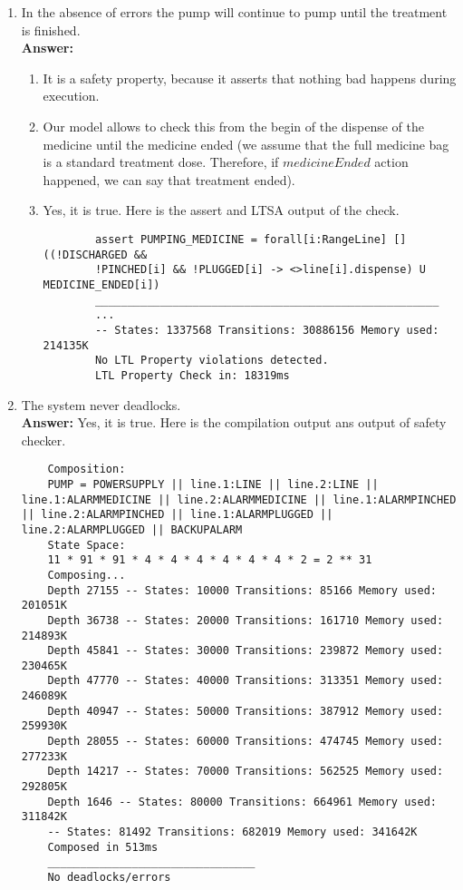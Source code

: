\documentclass{article}
\begin{document}
\begin{enumerate}
    \item In the absence of errors the pump will continue to pump until the treatment is finished.\\
    \textbf{Answer:} 
    \begin{enumerate}
    	\item It is a safety property, because it asserts that nothing bad happens during execution.
    	\item Our model allows to check this from the begin of the dispense of the medicine until the medicine ended 
    	(we assume that the full medicine bag is a standard treatment dose. Therefore, if $medicineEnded$ action happened, we
    	can say that treatment ended).
    	\item Yes, it is true. Here is the assert and LTSA output of the check.
    	\begin{verbatim}
    	assert PUMPING_MEDICINE = forall[i:RangeLine] []((!DISCHARGED && 
    	!PINCHED[i] && !PLUGGED[i] -> <>line[i].dispense) U MEDICINE_ENDED[i])
    	_____________________________________________________
	    ...
    	-- States: 1337568 Transitions: 30886156 Memory used: 214135K
    	No LTL Property violations detected.
    	LTL Property Check in: 18319ms
\end{verbatim}
	\end{enumerate}
    \item The system never deadlocks.\\
    \textbf{Answer:} 
    Yes, it is true. Here is the compilation output ans output of safety checker.
    \begin{verbatim}
    Composition:
    PUMP = POWERSUPPLY || line.1:LINE || line.2:LINE || line.1:ALARMMEDICINE || line.2:ALARMMEDICINE || line.1:ALARMPINCHED || line.2:ALARMPINCHED || line.1:ALARMPLUGGED || line.2:ALARMPLUGGED || BACKUPALARM
    State Space:
    11 * 91 * 91 * 4 * 4 * 4 * 4 * 4 * 4 * 2 = 2 ** 31
    Composing...
    Depth 27155 -- States: 10000 Transitions: 85166 Memory used: 201051K
    Depth 36738 -- States: 20000 Transitions: 161710 Memory used: 214893K
    Depth 45841 -- States: 30000 Transitions: 239872 Memory used: 230465K
    Depth 47770 -- States: 40000 Transitions: 313351 Memory used: 246089K
    Depth 40947 -- States: 50000 Transitions: 387912 Memory used: 259930K
    Depth 28055 -- States: 60000 Transitions: 474745 Memory used: 277233K
    Depth 14217 -- States: 70000 Transitions: 562525 Memory used: 292805K
    Depth 1646 -- States: 80000 Transitions: 664961 Memory used: 311842K
    -- States: 81492 Transitions: 682019 Memory used: 341642K
    Composed in 513ms
    ________________________________
    No deadlocks/errors
    \end{verbatim}
       

\end{enumerate}
\end{document}
